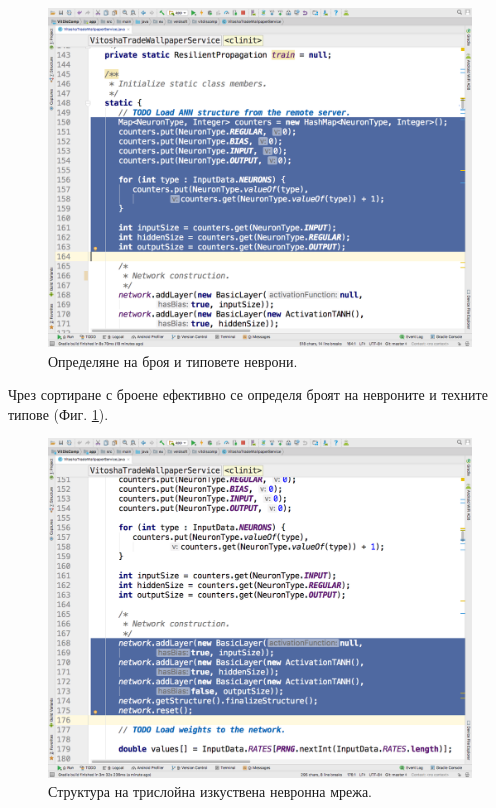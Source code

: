 \documentclass[book,14pt,oneside,openany]{memoir}
\begin{document}
\begin{figure}[h]
  \centering
  \includegraphics[height=0.45\pdfpageheight]{pic0036}
  \caption{Определяне на броя и типовете неврони.}
\label{fig:pic0036}
\end{figure}
\FloatBarrier

Чрез сортиране с броене ефективно се определя броят на невроните и техните типове (Фиг. \ref{fig:pic0036}).

\begin{figure}[h]
  \centering
  \includegraphics[height=0.45\pdfpageheight]{pic0037}
  \caption{Структура на трислойна изкуствена невронна мрежа.}
\label{fig:pic0037}
\end{figure}
\FloatBarrier
\end{document}
